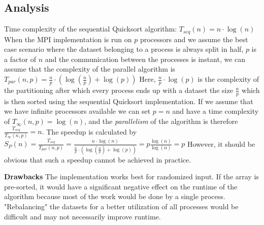 \documentclass[12pt,a4paper]{article}
\begin{document}
\subsection{Analysis}

Time complexity of the sequential Quicksort algorithm: $T_{seq}(n)=n\cdot \log(n)$\newline
When the MPI implementation is run on $p$ processors and we assume the best case scenario where the dataset belonging to a process is always split in half, $p$ is a factor of $n$ and the communication between the processes is instant, we can assume that the complexity of the parallel algorithm is $T_{par}(n,p)=\frac{n}{p}\cdot (\log(\frac{n}{p})+\log(p))$\newline
Here, $\frac{n}{p}\cdot \log(p)$ is the complexity of the partitioning after which every process ends up with a dataset the size $\frac{n}{p}$ which is then sorted using the sequential Quicksort implementation. If we assume that we have infinite processors available we can set $p=n$ and have a time complexity of $T_{\infty}(n,p)=\log(n)$, and the \emph{parallelism} of the algorithm is therefore $\frac{T_{seq}}{T_{\infty}(n,p)}=n.$\newline
The speedup is calculated by $S_P(n) = \frac{T_{seq}}{T_{par}(n,p)} = \frac{n\cdot \log(n)}{\frac{n}{p}\cdot (\log(\frac{n}{p})+\log(p))} = p\frac{\log(n)}{\log(n)} = p$\newline
However, it should be obvious that such a speedup cannot be achieved in practice.\newline

\noindent\textbf{Drawbacks}\newline
The implementation works best for randomized input. If the array is pre-sorted, it would have a significant negative effect on the runtime of the algorithm because most of the work would be done by a single process. "Rebalancing" the datasets for a better utilization of all processes would be difficult and may not necessarily improve runtime. 
\end{document}
